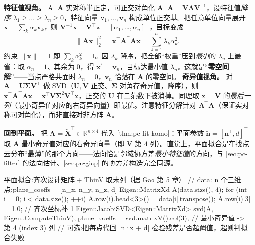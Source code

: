 \begin{derivation}[特征值视角与奇异值视角]
\textbf{特征值视角。} $\mathbf{A}^\top\mathbf{A}$ 实对称半正定，可正交对角化 $\mathbf{A}^\top\mathbf{A}=\mathbf{V}\boldsymbol{\Lambda}\mathbf{V}^{-1}$，设特征值\emph{降序} $\lambda_1\ge\dots\ge\lambda_n\ge0$，特征向量 $\mathbf{v}_1,\dots,\mathbf{v}_n$ 构成单位正交基。把任意单位向量展开 $\mathbf{x}=\sum_k\alpha_k\mathbf{v}_k$，则 $\mathbf{V}^{-1}\mathbf{x}=\mathbf{V}^\top\mathbf{x}=[\alpha_1,\dots,\alpha_n]^\top$，目标变成
\begin{equation}
  \|\mathbf{A}\mathbf{x}\|_2^2=\mathbf{x}^\top\mathbf{A}^\top\mathbf{A}\mathbf{x}=\sum_{k=1}^{n}\lambda_k\alpha_k^2 .
  \label{eq:pc-fit-spectral}
\end{equation}
约束 $\|\mathbf{x}\|=1$ 即 $\sum_k\alpha_k^2=1$。因 $\lambda_k$ 降序，把全部“权重”压到\emph{最小}的 $\lambda_n$ 上最省：取 $\alpha_n=1$、其余为 $0$，得 $\mathbf{x}^\ast=\mathbf{v}_n$，目标达最小值 $\lambda_n$。这就是“\textbf{零空间解}”——当点严格共面时 $\lambda_n=0$，$\mathbf{v}_n$ 恰落在 $\mathbf{A}$ 的零空间。
\textbf{奇异值视角。} 对 $\mathbf{A}=\mathbf{U}\boldsymbol{\Sigma}\mathbf{V}^\top$ 做 SVD（$\mathbf{U},\mathbf{V}$ 正交、$\boldsymbol{\Sigma}$ 对角存奇异值，降序），则 $\mathbf{x}^\top\mathbf{A}^\top\mathbf{A}\mathbf{x}=\mathbf{x}^\top\mathbf{V}\boldsymbol{\Sigma}^2\mathbf{V}^\top\mathbf{x}$，正交的 $\mathbf{U}$ 在二范数下被消掉。同理取 $\mathbf{x}=\mathbf{V}$ 的\emph{最后一列}（最小奇异值对应的右奇异向量）即最优。注意特征分解针对 $\mathbf{A}^\top\mathbf{A}$（保证实对称可对角化），而非直接对非方阵 $\mathbf{A}$。
\end{derivation}

\noindent\textbf{回到平面。} 把 $\mathbf{A}=\tilde{\mathbf{X}}^\top\in\mathbb{R}^{n\times4}$ 代入 \cref{thm:pc-fit-homo}：平面参数 $\tilde{\mathbf{n}}=[\mathbf{n}^\top,d]^\top$ 取 $\mathbf{A}$ 最小奇异值对应的右奇异向量（即 $\mathbf{V}$ 第 $4$ 列）。直觉上，平面拟合是在找点云分布“最薄”的那个方向——法向恰是邻域协方差\emph{最小特征值}的方向，与 \cref{sec:pc-filter} 的法向估计、\cref{sec:pc-gicp} 的协方差构造完全同源。

\begin{codebox}[C++]{平面拟合:齐次设计矩阵 + ThinV 取末列（据 Gao 第 5 章）}
// data: n 个三维点;plane_coeffs = [n_x, n_y, n_z, d]
Eigen::MatrixXd A(data.size(), 4);
for (int i = 0; i < data.size(); ++i) {
  A.row(i).head<3>() = data[i].transpose();
  A.row(i)[3]        = 1.0;                 // 齐次坐标补 1
}
Eigen::JacobiSVD<Eigen::MatrixXd> svd(A, Eigen::ComputeThinV);
plane_coeffs = svd.matrixV().col(3);       // 最小奇异值 -> 第 4 (index 3) 列
// 可选:把每点代回 |n·x + d| 检验残差是否超阈值，超则判拟合失败
\end{codebox}

